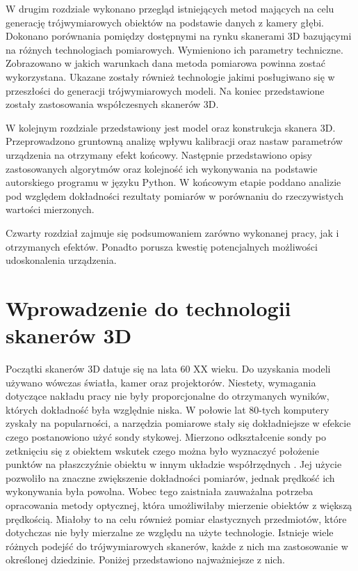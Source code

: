 \documentclass{pginz}
\begin{document}
W drugim rozdziale wykonano przegląd istniejących metod mających na celu generację trójwymiarowych obiektów na podstawie danych z kamery głębi. Dokonano porównania pomiędzy dostępnymi na rynku skanerami 3D bazującymi na różnych technologiach pomiarowych. Wymieniono ich parametry techniczne. Zobrazowano w jakich warunkach dana metoda pomiarowa powinna zostać wykorzystana. Ukazane zostały również technologie jakimi posługiwano się w przeszłości do generacji trójwymiarowych modeli. Na koniec przedstawione zostały zastosowania współczesnych skanerów 3D.

W kolejnym rozdziale przedstawiony jest model oraz konstrukcja skanera 3D. Przeprowadzono gruntowną analizę wpływu kalibracji oraz nastaw parametrów urządzenia na otrzymany efekt końcowy. Następnie przedstawiono opisy zastosowanych algorytmów oraz kolejność ich wykonywania na podstawie autorskiego programu w języku Python. W końcowym etapie poddano analizie pod względem dokładności rezultaty pomiarów w porównaniu do rzeczywistych wartości mierzonych.

Czwarty rozdział zajmuje się podsumowaniem zarówno wykonanej pracy, jak i otrzymanych efektów. Ponadto porusza kwestię potencjalnych możliwości udoskonalenia urządzenia.

\chapter{Wprowadzenie do technologii skanerów 3D}

Początki skanerów 3D datuje się na lata 60 XX wieku. Do uzyskania modeli używano wówczas światła, kamer oraz projektorów. Niestety, wymagania dotyczące nakładu pracy nie były proporcjonalne do otrzymanych wyników, których dokładność była względnie niska. W połowie lat 80-tych komputery zyskały na popularności, a narzędzia pomiarowe stały się dokładniejsze w efekcie czego postanowiono użyć sondy stykowej. Mierzono odkształcenie sondy po zetknięciu się z obiektem wskutek czego można było wyznaczyć położenie punktów na płaszczyźnie obiektu w innym układzie współrzędnych \cite{abdel20113d}. Jej użycie pozwoliło na znaczne zwiększenie dokładności pomiarów, jednak prędkość ich wykonywania była powolna. Wobec tego zaistniała zauważalna potrzeba opracowania metody optycznej, która umożliwiłaby mierzenie obiektów z większą prędkością. Miałoby to na celu również pomiar elastycznych przedmiotów, które dotychczas nie były mierzalne ze względu na użyte technologie. Istnieje wiele różnych podejść do trójwymiarowych skanerów, każde z nich ma zastosowanie w określonej dziedzinie. Poniżej przedstawiono najważniejsze z nich.
\end{document}
